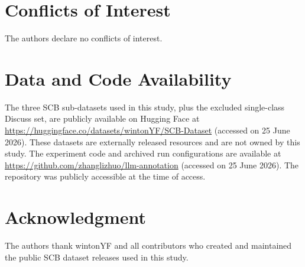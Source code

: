 \documentclass{ieeeaccess}
\begin{document}
\section*{Conflicts of Interest}
The authors declare no conflicts of interest.

\section*{Data and Code Availability}
The three SCB sub-datasets used in this study, plus the excluded
single-class Discuss set, are publicly available on Hugging Face at
\url{https://huggingface.co/datasets/wintonYF/SCB-Dataset} (accessed on
25 June 2026). These datasets are externally released resources and are
not owned by this study. The experiment code and archived run
configurations are available at
\url{https://github.com/zhanglizhuo/llm-annotation} (accessed on 25 June 2026).
The repository was publicly accessible at the time of access.

\section*{Acknowledgment}
The authors thank wintonYF and all contributors who created and maintained
the public SCB dataset releases used in this study.
\end{document}
